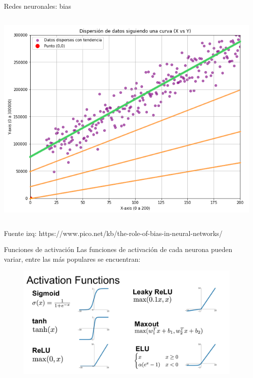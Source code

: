 \begin{frame}{Redes neuronales: bias}
\begin{columns}[c]
\begin{column}{0.4\textwidth}
    \includegraphics[width=\textwidth]{figures/Introduccion/bias-si-data.png}
\end{column}
\end{columns}

\scriptsize{
Fuente izq: https://www.pico.net/kb/the-role-of-bias-in-neural-networks/
}

\end{frame}

\begin{frame}{Funciones de activación}
Las \alert{funciones de activación} de cada neurona pueden variar, entre las más populares se encuentran:

\begin{figure}
\centering
    \includegraphics[width=\textwidth]{figures/Tema 3/Activations.png}
    \caption{\cite{Activations}}
\end{figure}
\end{frame}

